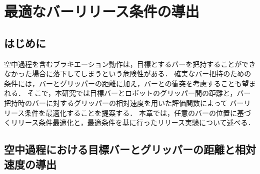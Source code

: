 \chapter[最適なバーリリース条件の導出]%
{最適なバーリリース条件の導出}
        \section{はじめに}

        空中過程を含むブラキエーション動作は，目標とするバーを把持することができなかった場合に落下してしまうという危険性がある．
        確実なバー把持のための条件には，バーとグリッパーの距離に加え，バーとの衝突を考慮することも望まれる．
        そこで，本研究では目標バーとロボットのグリッパー間の距離と，バー把持時のバーに対するグリッパーの相対速度を用いた評価関数によって
        バーリリース条件を最適化することを提案する．
        本章では，任意のバーの位置に基づくリリース条件最適化と，最適条件を基に行ったリリース実験について述べる．

        \section{空中過程における目標バーとグリッパーの距離と相対速度の導出}

